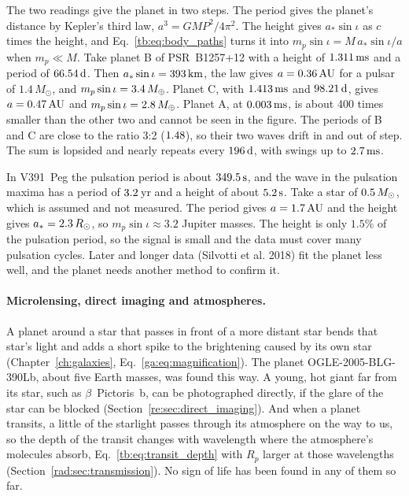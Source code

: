 The two readings give the planet in two steps. The period gives the planet's distance by Kepler's third law, $a^3=GMP^2/4\pi^2$. The height gives $a_*\sin\iota$ as $c$ times the height, and Eq.~\eqref{tb:eq:body_paths} turns it into $m_p\sin\iota=M\,a_*\sin\iota/a$ when $m_p\ll M$. Take planet B of PSR~B1257+12 with a height of $1.311\,\mathrm{ms}$ and a period of $66.54\,\mathrm d$. Then $a_*\sin\iota=393\,\mathrm{km}$, the law gives $a=0.36\,\mathrm{AU}$ for a pulsar of $1.4\,M_\odot$, and $m_p\sin\iota=3.4\,M_\oplus$. Planet C, with $1.413\,\mathrm{ms}$ and $98.21\,\mathrm d$, gives $a=0.47\,\mathrm{AU}$ and $m_p\sin\iota=2.8\,M_\oplus$. Planet A, at $0.003\,\mathrm{ms}$, is about 400 times smaller than the other two and cannot be seen in the figure. The periods of B and C are close to the ratio 3:2 ($1.48$), so their two waves drift in and out of step. The sum is lopsided and nearly repeats every $196\,\mathrm d$, with swings up to $2.7\,\mathrm{ms}$.

In V391~Peg the pulsation period is about $349.5\,\mathrm s$, and the wave in the pulsation maxima has a period of $3.2\,$yr and a height of about $5.2\,\mathrm s$. Take a star of $0.5\,M_\odot$, which is assumed and not measured. The period gives $a=1.7\,\mathrm{AU}$ and the height gives $a_*=2.3\,R_\odot$, so $m_p\sin\iota\approx3.2$ Jupiter masses. The height is only $1.5\%$ of the pulsation period, so the signal is small and the data must cover many pulsation cycles. Later and longer data (Silvotti et al. 2018) fit the planet less well, and the planet needs another method to confirm it.

\paragraph{Microlensing, direct imaging and atmospheres.} A planet around a star that passes in front of a more distant star bends that star's light and adds a short spike to the brightening caused by its own star (Chapter~\ref{ch:galaxies}, Eq.~\eqref{ga:eq:magnification}). The planet OGLE-2005-BLG-390Lb, about five Earth masses, was found this way. A young, hot giant far from its star, such as $\beta$~Pictoris~b, can be photographed directly, if the glare of the star can be blocked (Section~\ref{re:sec:direct_imaging}). And when a planet transits, a little of the starlight passes through its atmosphere on the way to us, so the depth of the transit changes with wavelength where the atmosphere's molecules absorb, Eq.~\eqref{tb:eq:transit_depth} with $R_p$ larger at those wavelengths (Section~\ref{rad:sec:transmission}). No sign of life has been found in any of them so far.

